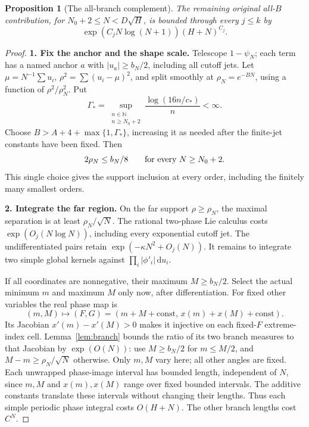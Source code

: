 \documentclass[11pt]{article}
\numberwithin{equation}{section}
\newtheorem{proposition}[theorem]{Proposition}
\theoremstyle{definition}
\newcommand{\dd}{\,\mathrm d}
\begin{document}
\begin{proposition}[The all-branch complement]\label{prop:allB}
The remaining original all-\(B\) contribution, for
\(N_0+2\le N<D\sqrt H\), is bounded through every \(j\le k\) by
\[
 \exp(C_jN\log(N+1))(H+N)^{C_j}.
\]
\end{proposition}
\begin{proof}
\noindent\textbf{1. Fix the anchor and the shape scale.} Telescope \(1-\psi_N\); each term has a named anchor \(a\) with
\(|u_a|\ge b_N/2\), including all cutoff jets.
Let \(\mu=N^{-1}\sum u_i\), \(\rho^2=\sum(u_i-\mu)^2\), and split
smoothly at \(\rho_N=e^{-BN}\), using a function of
\(\rho^2/\rho_N^2\). Put
\[
 \Gamma_* = \sup_{\substack{n\in\mathbb N\\n\ge N_0+2}}
                   \frac{\log(16n/c_*)}{n}<\infty.
\]
Choose \(B>A+4+\max\{1,\Gamma_*\}\), increasing it as needed
after the finite-jet constants have been fixed. Then
\[
 2\rho_N\le b_N/8\qquad\hbox{for every }N\ge N_0+2.
\]
This single choice gives the support inclusion at every order,
including the finitely many smallest orders.

\par\smallskip\noindent\textbf{2. Integrate the far region.} On the far support \(\rho\ge\rho_N\), the maximal separation
is at least \(\rho_N/\sqrt N\). The rational two-phase Lie
calculus costs \(\exp(O_j(N\log N))\), including every exponential
cutoff jet. The undifferentiated pairs retain
\(\exp(-\kappa N^2+O_j(N))\).
It remains to integrate two simple global kernels against
\(\prod_i|\phi'_i|\dd u_i\).

If all coordinates are nonnegative, their maximum \(M\ge b_N/2\).
Select the actual minimum \(m\) and maximum \(M\) only now,
after differentiation. For fixed other variables the real phase
map is
\[
 (m,M)\longmapsto(F,G)
    =(m+M+\mathrm{const},\,x(m)+x(M)+\mathrm{const}).
\]
Its Jacobian \(x'(m)-x'(M)>0\) makes it injective on each fixed-\(F\)
extreme-index cell. Lemma~\ref{lem:branch} bounds the ratio of its
two branch measures to that Jacobian by \(\exp(O(N))\):
use \(M\ge b_N/2\) for \(m\le M/2\), and
\(M-m\ge\rho_N/\sqrt N\) otherwise.
Only \(m,M\) vary here; all other angles are fixed. Each unwrapped
phase-image interval has bounded length, independent of \(N\), since
\(m,M\) and \(x(m),x(M)\) range over fixed bounded intervals.
The additive constants translate these intervals without changing
their lengths. Thus each simple periodic phase integral costs
\(O(H+N)\). The other branch lengths cost \(C^N\).


\end{proof}
\end{document}
